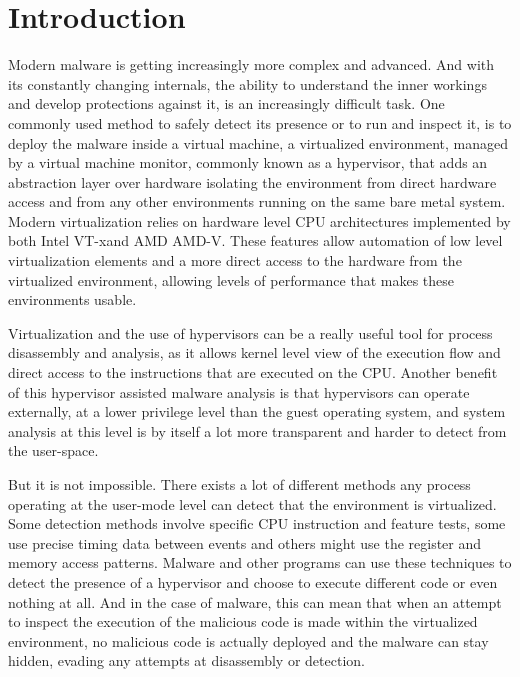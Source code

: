 \section{Introduction}\label{s:intro}

Modern malware is getting increasingly more complex and advanced. 
And with its constantly changing internals, the ability to understand the inner workings and develop protections against it, is an increasingly difficult task. 
One commonly used method to safely detect its presence or to run and inspect it, is to deploy the malware inside a virtual machine, a virtualized environment, managed by a virtual machine monitor, 
commonly known as a hypervisor, that adds an abstraction layer over hardware isolating the environment from direct hardware access and from any other environments running on the same bare metal system. 
Modern virtualization relies on hardware level CPU architectures implemented by both Intel\textsuperscript{\tiny\textregistered} VT-x\texttrademark and AMD\textsuperscript{\tiny\textregistered} AMD-V\texttrademark. 
These features allow automation of low level virtualization elements and a more direct access to the hardware from the virtualized environment, allowing levels of performance that makes these environments usable.

Virtualization and the use of hypervisors can be a really useful tool for process disassembly and analysis, as it allows kernel level view of the execution flow and direct access to the instructions that are executed on the CPU.
Another benefit of this hypervisor assisted malware analysis is that hypervisors can operate externally, at a lower privilege level than the guest operating system, 
and system analysis at this level is by itself a lot more transparent and harder to detect from the user-space.

But it is not impossible. There exists a lot of different methods any process operating at the user-mode level can detect that the environment is virtualized. 
Some detection methods involve specific CPU instruction and feature tests, some use precise timing data between events and others might use the register and memory access patterns. 
Malware and other programs can use these techniques to detect the presence of a hypervisor and choose to execute different code or even nothing at all. And in the case of malware, 
this can mean that when an attempt to inspect the execution of the malicious code is made within the virtualized environment, no malicious code is actually deployed and the malware can stay hidden, evading any attempts at disassembly or detection.

